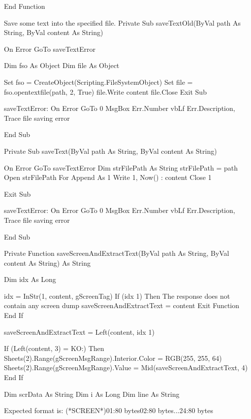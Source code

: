 \documentclass[letterpaper,10pt,english]{sphinxmanual}
\begin{document}
\begin{sphinxVerbatim}[commandchars=\\\{\}]
End Function


\PYGZsq{} Save some text into the specified file.
\PYGZsq{}
Private Sub saveTextOld(ByVal path As String, ByVal content As String)

   On Error GoTo saveTextError

   Dim fso As Object
   Dim file As Object

   Set fso = CreateObject(\PYGZdq{}Scripting.FileSystemObject\PYGZdq{})
   Set file = fso.opentextfile(path, 2, True)
   file.Write content
   file.Close
   Exit Sub

saveTextError:
   On Error GoTo 0
   MsgBox Err.Number \PYGZam{} vbLf \PYGZam{} Err.Description, \PYGZdq{}Trace file saving error\PYGZdq{}

End Sub

Private Sub saveText(ByVal path As String, ByVal content As String)

   On Error GoTo saveTextError
   Dim strFile\PYGZus{}Path As String
   strFile\PYGZus{}Path = path
   Open strFile\PYGZus{}Path For Append As \PYGZsh{}1
   Write \PYGZsh{}1, Now() \PYGZam{} \PYGZdq{} : \PYGZdq{} \PYGZam{} content
   Close \PYGZsh{}1

   Exit Sub

saveTextError:
   On Error GoTo 0
   MsgBox Err.Number \PYGZam{} vbLf \PYGZam{} Err.Description, \PYGZdq{}Trace file saving error\PYGZdq{}

End Sub


Private Function saveScreenAndExtractText(ByVal path As String, ByVal content As String) As String

   Dim idx As Long

   idx = InStr(1, content, g\PYGZus{}ScreenTag)
   If (idx \PYGZlt{} 1) Then
      \PYGZsq{} The response does not contain any screen dump
      saveScreenAndExtractText = content
      Exit Function
   End If

   saveScreenAndExtractText = Left(content, idx \PYGZhy{} 1)

   If (Left(content, 3) = \PYGZdq{}KO:\PYGZdq{}) Then
      Sheets(2).Range(g\PYGZus{}ScreenMsgRange).Interior.Color = RGB(255, 255, 64)
      Sheets(2).Range(g\PYGZus{}ScreenMsgRange).Value = \PYGZdq{}  \PYGZdq{} \PYGZam{} Mid(saveScreenAndExtractText, 4)
   End If

   Dim scrData As String
   Dim i As Long
   Dim line As String

   \PYGZsq{} Expected format is:
   \PYGZsq{} (*SCREEN*)\PYGZsh{}01:\PYGZlt{}80 bytes\PYGZgt{}\PYGZsh{}02:\PYGZlt{}80 bytes\PYGZgt{}...\PYGZsh{}24:\PYGZlt{}80 bytes\PYGZgt{}


\end{sphinxVerbatim}
\end{document}
